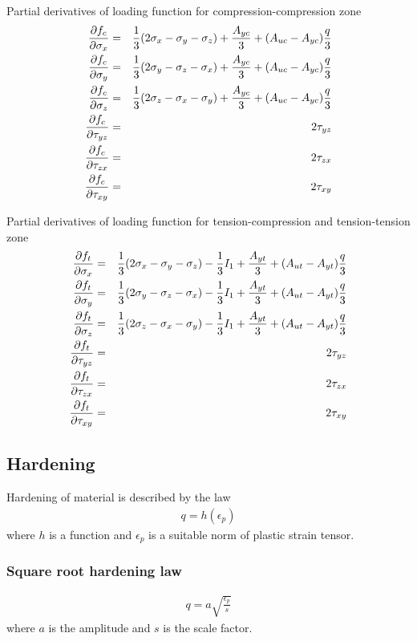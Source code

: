Partial derivatives of loading function for compression-compression zone
\begin{eqnarray}
\ppd{f_c}{\sigma_x} &=& \del{1}{3}(2\sigma_x - \sigma_y - \sigma_z) + \del{A_{yc}}{3} + (A_{uc}-A_{yc})\del{q}{3}
\\
\ppd{f_c}{\sigma_y} &=& \del{1}{3}(2\sigma_y - \sigma_z - \sigma_x) + \del{A_{yc}}{3} + (A_{uc}-A_{yc})\del{q}{3}
\\
\ppd{f_c}{\sigma_z} &=& \del{1}{3}(2\sigma_z - \sigma_x - \sigma_y) + \del{A_{yc}}{3} + (A_{uc}-A_{yc})\del{q}{3}
\\
\ppd{f_c}{\tau_{yz}} &=& 2\tau_{yz}
\\
\ppd{f_c}{\tau_{zx}} &=& 2\tau_{zx}
\\
\ppd{f_c}{\tau_{xy}} &=& 2\tau_{xy}
\end{eqnarray}

Partial derivatives of loading function for tension-compression and tension-tension zone
\begin{eqnarray}
\ppd{f_t}{\sigma_x} &=& \del{1}{3}(2\sigma_x - \sigma_y - \sigma_z) - \del{1}{3}I_1 + \del{A_{yt}}{3} + (A_{ut}-A_{yt})\del{q}{3}
\\
\ppd{f_t}{\sigma_y} &=& \del{1}{3}(2\sigma_y - \sigma_z - \sigma_x) - \del{1}{3}I_1 + \del{A_{yt}}{3} + (A_{ut}-A_{yt})\del{q}{3}
\\
\ppd{f_t}{\sigma_z} &=& \del{1}{3}(2\sigma_z - \sigma_x - \sigma_y) - \del{1}{3}I_1 + \del{A_{yt}}{3} + (A_{ut}-A_{yt})\del{q}{3}
\\
\ppd{f_t}{\tau_{yz}} &=& 2\tau_{yz}
\\
\ppd{f_t}{\tau_{zx}} &=& 2\tau_{zx}
\\
\ppd{f_t}{\tau_{xy}} &=& 2\tau_{xy}
\end{eqnarray}

\subsection{Hardening}

Hardening of material is described by the law
\begin{eqnarray}
q = h (\epsilon_p)
\end{eqnarray}
where $h$ is a function and $\epsilon_p$ is a suitable norm of plastic strain tensor.

\subsubsection{Square root hardening law}
\begin{eqnarray}
q = a \sqrt{\frac{\epsilon_p}{s}}
\end{eqnarray}
where $a$ is the amplitude and $s$ is the scale factor.

